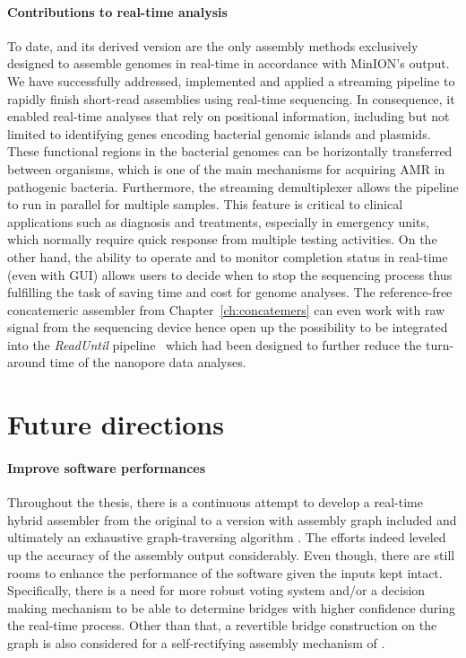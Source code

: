 \paragraph{Contributions to real-time analysis}
To date, \npscarf{} and its derived version \npgraph{} are the only assembly methods exclusively designed to assemble genomes in real-time in accordance with MinION's output.
We have successfully addressed, implemented and applied a streaming pipeline to rapidly finish short-read assemblies using real-time sequencing.
In consequence, it enabled real-time analyses that rely on positional information, including but not limited to identifying genes encoding bacterial genomic islands and plasmids.
These functional regions in the bacterial genomes can be horizontally  transferred  between  organisms,  which  is  one  of  the  main  mechanisms for acquiring AMR in pathogenic bacteria.  
Furthermore, the streaming demultiplexer \npbarcode{} allows the pipeline to run in parallel for multiple samples.
This feature is critical to clinical applications such as diagnosis and treatments, especially in emergency units, which normally require quick response from multiple testing activities.
On the other hand, the ability to operate and to monitor completion status in real-time (even with GUI) allows users to decide when to stop the sequencing process thus fulfilling the task of saving time and cost for genome analyses.
The reference-free concatemeric assembler from Chapter~\ref{ch:concatemers} can even work with raw signal from the sequencing device hence open up the possibility to be integrated into the \emph{ReadUntil} pipeline~\cite{LooseMS2016} which had been designed to further reduce the turn-around time of the nanopore data analyses.
\section{Future directions}
\paragraph{Improve software performances}
Throughout the thesis, there is a continuous attempt to develop a real-time hybrid assembler from the original \npscarf{} to a version with assembly graph included and ultimately an exhaustive graph-traversing algorithm \npgraph{}. 
The efforts indeed leveled up the accuracy of the assembly output considerably.
Even though, there are still rooms to enhance the performance of the software given the inputs kept intact.
Specifically, there is a need for more robust voting system and/or a decision making mechanism to be able to determine bridges with higher confidence during the real-time process.  
Other than that, a revertible bridge construction on the graph is also considered for a self-rectifying assembly mechanism of \npgraph{}. 

